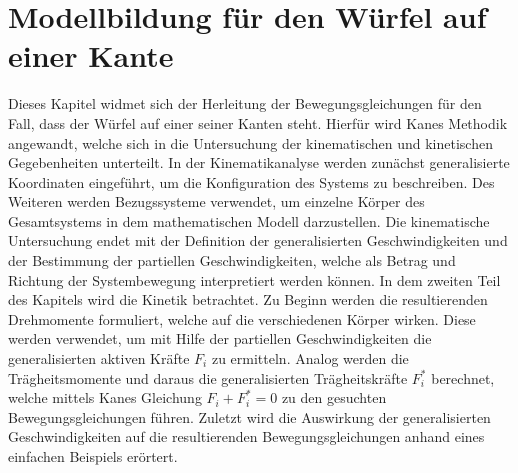 \ifx\FORMAT\undefined


\fi

\chapter{Modellbildung für den Würfel auf  einer Kante}\label{chapter_TM_Edge}
Dieses Kapitel widmet sich der Herleitung der Bewegungsgleichungen für den Fall, dass der Würfel auf einer seiner Kanten steht. Hierfür wird Kanes Methodik \cite{KaneBook} angewandt, welche sich in die Untersuchung der kinematischen und kinetischen Gegebenheiten unterteilt. In der Kinematikanalyse werden zunächst generalisierte Koordinaten eingeführt, um die Konfiguration des Systems zu beschreiben. Des Weiteren werden Bezugssysteme verwendet, um einzelne Körper des Gesamtsystems in dem mathematischen Modell darzustellen. Die kinematische Untersuchung endet mit der Definition der generalisierten Geschwindigkeiten und der Bestimmung der partiellen Geschwindigkeiten, welche als Betrag und Richtung der Systembewegung interpretiert werden können.
In dem zweiten Teil des Kapitels wird die Kinetik betrachtet. Zu Beginn werden die resultierenden Drehmomente formuliert, welche auf die verschiedenen Körper wirken. Diese werden verwendet, um mit Hilfe der partiellen Geschwindigkeiten die generalisierten aktiven Kräfte $F_i$ zu ermitteln. Analog werden die Trägheitsmomente und daraus die generalisierten Trägheitskräfte $F^*_i$ berechnet, welche mittels Kanes Gleichung $F_i+F^*_i=0$ zu den gesuchten Bewegungsgleichungen führen. Zuletzt wird die Auswirkung der generalisierten Geschwindigkeiten auf die resultierenden Bewegungsgleichungen anhand eines einfachen Beispiels erörtert.
\newpage

\newpage


\ifx\FORMAT\undefined

\fi